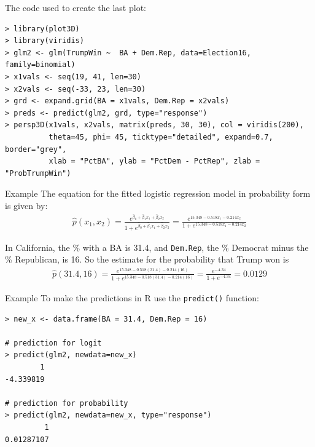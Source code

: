 \documentclass[10pt]{beamer}\usepackage[]{graphicx}\usepackage[]{color}
\begin{document}
\begin{frame}[fragile]
\vspace{-2cm}
The code used to create the last plot:
\scriptsize
\begin{verbatim}
> library(plot3D)
> library(viridis)
> glm2 <- glm(TrumpWin ~  BA + Dem.Rep, data=Election16, family=binomial)
> x1vals <- seq(19, 41, len=30)
> x2vals <- seq(-33, 23, len=30)
> grd <- expand.grid(BA = x1vals, Dem.Rep = x2vals)
> preds <- predict(glm2, grd, type="response")
> persp3D(x1vals, x2vals, matrix(preds, 30, 30), col = viridis(200),
          theta=45, phi= 45, ticktype="detailed", expand=0.7, border="grey",
          xlab = "PctBA", ylab = "PctDem - PctRep", zlab = "ProbTrumpWin")
\end{verbatim}
\end{frame}

\begin{frame}{Example}
The equation for the fitted logistic regression model in probability form is given by:
\begin{align*}
\hat{p}(x_1, x_2) = \frac{e^{\hat{\beta}_0 + \hat{\beta}_1 x_1 + \hat{\beta}_2 x_2}}{1 + e^{\hat{\beta}_0 + \hat{\beta}_1 x_1 + \hat{\beta}_2 x_2}}
= \frac{e^{15.348 - 0.518 x_1 - 0.214 x_2}}{1 + e^{15.348 - 0.518 x_1 - 0.214 x_2}}
\end{align*}
\vspace{10pt}

In California, the \% with a BA is 31.4, and \texttt{Dem.Rep}, the \% Democrat minus the \% Republican, is 16.  So the estimate for the probability that Trump won is   
\begin{align*}
\hat{p}(31.4, 16)
= \frac{e^{15.348 - 0.518(31.4) - 0.214(16)}}{1 + e^{15.348 - 0.518(31.4) - 0.214(16)}} = 
\frac{e^{-4.34}}{1+e^{-4.34}} = 0.0129
\end{align*}
\end{frame}


\begin{frame}[fragile]{Example}
To make the predictions in R use the \texttt{predict()} function:
\begin{verbatim}
> new_x <- data.frame(BA = 31.4, Dem.Rep = 16)

# prediction for logit
> predict(glm2, newdata=new_x)
        1 
-4.339819 

# prediction for probability
> predict(glm2, newdata=new_x, type="response")
         1 
0.01287107 
\end{verbatim}
\end{frame}
\end{document}
